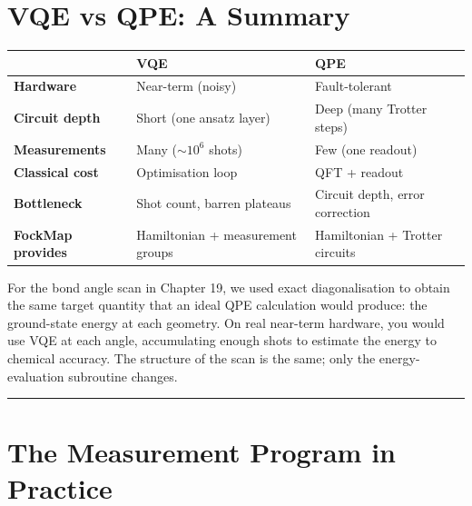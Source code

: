 \documentclass[
  11pt,
  oneside]{book}
\begin{document}
\section{VQE vs QPE: A Summary}\label{vqe-vs-qpe-a-summary}

\begin{longtable}[]{@{}
  >{\raggedright\arraybackslash}p{}
  >{\raggedright\arraybackslash}p{}
  >{\raggedright\arraybackslash}p{}@{}}
\toprule\noalign{}
\begin{minipage}[b]{\linewidth}\raggedright
\end{minipage} & \begin{minipage}[b]{\linewidth}\raggedright
VQE
\end{minipage} & \begin{minipage}[b]{\linewidth}\raggedright
QPE
\end{minipage} \\
\midrule\noalign{}
\endhead
\bottomrule\noalign{}
\endlastfoot
\textbf{Hardware} & Near-term (noisy) & Fault-tolerant \\
\textbf{Circuit depth} & Short (one ansatz layer) & Deep (many Trotter
steps) \\
\textbf{Measurements} & Many (\(\sim 10^6\) shots) & Few (one
readout) \\
\textbf{Classical cost} & Optimisation loop & QFT + readout \\
\textbf{Bottleneck} & Shot count, barren plateaus & Circuit depth, error
correction \\
\textbf{FockMap provides} & Hamiltonian + measurement groups &
Hamiltonian + Trotter circuits \\
\end{longtable}

For the bond angle scan in Chapter 19, we used exact diagonalisation to
obtain the same target quantity that an ideal QPE calculation would
produce: the ground-state energy at each geometry. On real near-term
hardware, you would use VQE at each angle, accumulating enough shots to
estimate the energy to chemical accuracy. The structure of the scan is
the same; only the energy-evaluation subroutine changes.

\begin{center}\rule{0.5\linewidth}{0.5pt}\end{center}

\section{The Measurement Program in
Practice}\label{the-measurement-program-in-practice}
\end{document}
